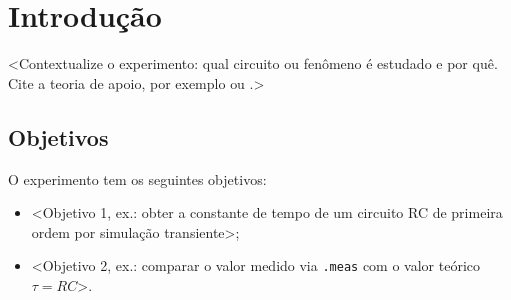 \chapter{Introdução}
\label{cap:introducao}

<Contextualize o experimento: qual circuito ou fenômeno é estudado e por
quê. Cite a teoria de apoio, por exemplo \cite{Sedra:2015} ou
\cite{Horowitz:2015}.>

\section{Objetivos}
\label{sec:objetivos}

O experimento tem os seguintes objetivos:

\begin{itemize}
  \item <Objetivo 1, ex.: obter a constante de tempo de um circuito RC
        de primeira ordem por simulação transiente>;
  \item <Objetivo 2, ex.: comparar o valor medido via \texttt{.meas}
        com o valor teórico $\tau = RC$>.
\end{itemize}
